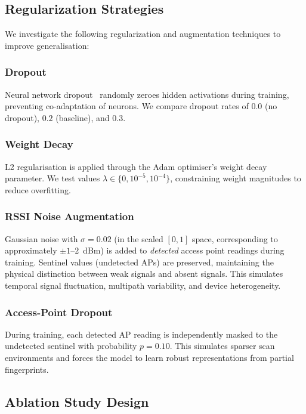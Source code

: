 \subsection{Regularization Strategies}

We investigate the following regularization and augmentation techniques to improve generalisation:

\subsubsection{Dropout}
Neural network dropout~\cite{srivastava2014dropout} randomly zeroes hidden activations during training, preventing co-adaptation of neurons. We compare dropout rates of $0.0$ (no dropout), $0.2$ (baseline), and $0.3$.

\subsubsection{Weight Decay}
L2 regularisation is applied through the Adam optimiser's weight decay parameter. We test values $\lambda \in \{0, 10^{-5}, 10^{-4}\}$, constraining weight magnitudes to reduce overfitting.

\subsubsection{RSSI Noise Augmentation}
Gaussian noise with $\sigma = 0.02$ (in the scaled $[0,1]$ space, corresponding to approximately $\pm 1$--$2$~dBm) is added to \emph{detected} access point readings during training. Sentinel values (undetected APs) are preserved, maintaining the physical distinction between weak signals and absent signals. This simulates temporal signal fluctuation, multipath variability, and device heterogeneity.

\subsubsection{Access-Point Dropout}
During training, each detected AP reading is independently masked to the undetected sentinel with probability $p = 0.10$. This simulates sparser scan environments and forces the model to learn robust representations from partial fingerprints.

\subsection{Ablation Study Design}

